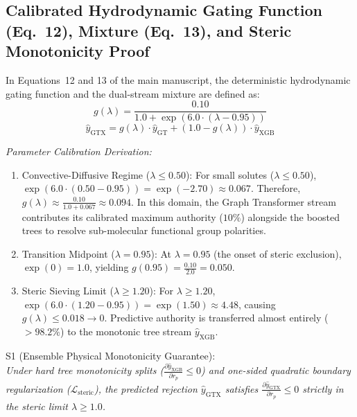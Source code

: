 \documentclass[11pt]{article}
\begin{document}
\subsection{Calibrated Hydrodynamic Gating Function (Eq.~12), Mixture (Eq.~13), and Steric Monotonicity Proof}
\label{sec:calibrated_gating_proof}

In Equations~12 and 13 of the main manuscript, the deterministic hydrodynamic gating function and the dual-stream mixture are defined as:
\begin{equation}
g(\lambda) = \frac{0.10}{1.0 + \exp\left(6.0 \cdot (\lambda - 0.95)\right)}
\label{eq:s_gate}
\end{equation}
\begin{equation}
\hat{y}_{\mathrm{GTX}} = g(\lambda) \cdot \hat{y}_{\mathrm{GT}} + \left(1.0 - g(\lambda)\right) \cdot \hat{y}_{\mathrm{XGB}}
\label{eq:s_mixture}
\end{equation}

\noindent\textit{Parameter Calibration Derivation:}
\begin{enumerate}[leftmargin=1.0cm]
    \item Convective-Diffusive Regime ($\lambda \le 0.50$): For small solutes ($\lambda \le 0.50$), $\exp(6.0 \cdot (0.50 - 0.95)) = \exp(-2.70) \approx 0.067$. Therefore, $g(\lambda) \approx \frac{0.10}{1.0 + 0.067} \approx 0.094$. In this domain, the Graph Transformer stream contributes its calibrated maximum authority ($10\%$) alongside the boosted trees to resolve sub-molecular functional group polarities.
    \item Transition Midpoint ($\lambda = 0.95$): At $\lambda = 0.95$ (the onset of steric exclusion), $\exp(0) = 1.0$, yielding $g(0.95) = \frac{0.10}{2.0} = 0.050$.
    \item Steric Sieving Limit ($\lambda \ge 1.20$): For $\lambda \ge 1.20$, $\exp(6.0 \cdot (1.20 - 0.95)) = \exp(1.50) \approx 4.48$, causing $g(\lambda) \le 0.018 \to 0$. Predictive authority is transferred almost entirely ($>98.2\%$) to the monotonic tree stream $\hat{y}_{\mathrm{XGB}}$.
\end{enumerate}

\noindentTheorem S1 (Ensemble Physical Monotonicity Guarantee): \\
\textit{Under hard tree monotonicity splits ($\frac{\partial \hat{y}_{\mathrm{XGB}}}{\partial r_p} \le 0$) and one-sided quadratic boundary regularization ($\mathcal{L}_{\mathrm{steric}}$), the predicted rejection $\hat{y}_{\mathrm{GTX}}$ satisfies $\frac{\partial \hat{y}_{\mathrm{GTX}}}{\partial r_p} \le 0$ strictly in the steric limit $\lambda \ge 1.0$.}
\end{document}

